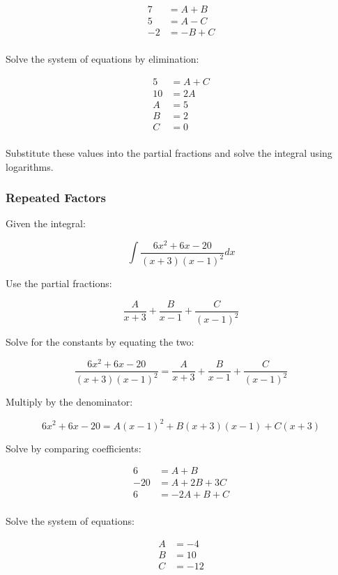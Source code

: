 \documentclass[a4paper,11pt]{article}
\begin{document}
$$
\begin{aligned}
7 & = A + B \\
5 & = A - C \\
-2 & = -B + C \\
\end{aligned}
$$

Solve the system of equations by elimination:

$$
\begin{aligned}
5 & = A + C \\
10 & = 2A \\
A & = 5 \\
B & = 2 \\
C & = 0 \\
\end{aligned}
$$

Substitute these values into the partial fractions and solve the integral using
logarithms.


\subsubsection{Repeated Factors}

Given the integral:

$$
\int \frac{6x^2 + 6x - 20}{(x + 3)(x - 1)^2} dx
$$

Use the partial fractions:

$$
\frac{A}{x + 3} + \frac{B}{x - 1} + \frac{C}{(x - 1)^2}
$$

Solve for the constants by equating the two:

$$
\frac{6x^2 + 6x - 20}{(x + 3)(x - 1)^2} = \frac{A}{x + 3} + \frac{B}{x - 1} + \frac{C}{(x - 1)^2}
$$

Multiply by the denominator:

$$
6x^2 + 6x - 20 = A(x - 1)^2 + B(x + 3)(x - 1) + C(x + 3)
$$

Solve by comparing coefficients:

$$
\begin{aligned}
6 & = A + B \\
-20 & = A + 2B + 3C \\
6 & = -2A + B + C \\
\end{aligned}
$$

Solve the system of equations:

$$
\begin{aligned}
A & = -4 \\
B & = 10 \\
C & = -12 \\
\end{aligned}
$$
\end{document}

